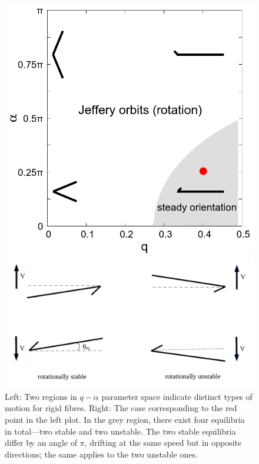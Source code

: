 \documentclass[lineno]{JFM-FLM_Au}
\begin{document}
\begin{figure}[htbp]
	\centering
	\begin{minipage}[t]{0.4\textwidth}
		\centering
		\includegraphics[width=\linewidth]{plot/rigid_case/q_alpha_plot_with_point.png}
	\end{minipage}
	\hfill
	\begin{minipage}[t]{0.58\textwidth}
		\centering
		\includegraphics[width=\linewidth]{plot/rigid_case/q_alpha_plot_with_point_four_equilibria.png}
	\end{minipage}
	\caption{Left: Two regions in $q-\alpha$ parameter space indicate distinct types of motion for rigid fibres. Right: The case corresponding to the red point in the left plot. In the grey region, there exist four equilibria in total—two stable and two unstable. The two stable equilibria differ by an angle of $\pi$, drifting at the same speed but in opposite directions; the same applies to the two unstable ones.}
	\label{fig:18}
\end{figure}
\end{document}
